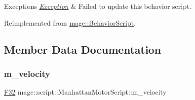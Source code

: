 \begin{DoxyExceptions}{Exceptions}
{\em \hyperlink{classmage_1_1_exception}{Exception}} & Failed to update this behavior script. \\
\hline
\end{DoxyExceptions}


Reimplemented from \hyperlink{classmage_1_1_behavior_script_afb9cf3759edf8876416d1df85489cba6}{mage\+::\+Behavior\+Script}.



\subsection{Member Data Documentation}
\hypertarget{classmage_1_1script_1_1_manhattan_motor_script_a38cdef10269075f08f3fcdc9ed8bc520}{}\label{classmage_1_1script_1_1_manhattan_motor_script_a38cdef10269075f08f3fcdc9ed8bc520} 
\subsubsection{\texorpdfstring{m\+\_\+velocity}{m\_velocity}}
{\footnotesize\ttfamily \hyperlink{namespacemage_aa97e833b45f06d60a0a9c4fc22ae02c0}{F32} mage\+::script\+::\+Manhattan\+Motor\+Script\+::m\+\_\+velocity\hspace{0.3cm}{\ttfamily [private]}}

